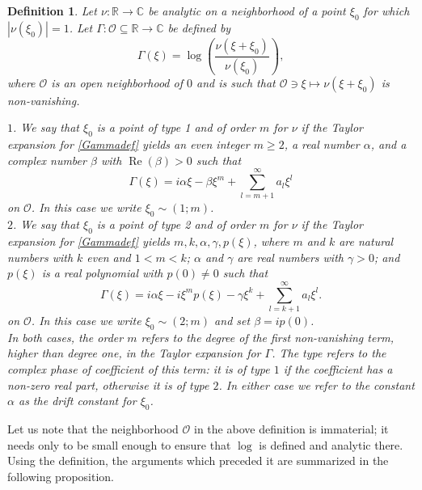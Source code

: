 \documentclass{article}
\theoremstyle{theorem}
\newtheorem{definition}[theorem]{Definition}
\theoremstyle{remark}
\renewcommand\Re{\operatorname{Re}}%
\begin{document}
\begin{definition}\label{types}
Let  $\nu:\mathbb{R}\rightarrow\mathbb{C}$ be analytic on a neighborhood of a point $\xi_0$ for which $|\nu(\xi_0)|=1$. Let $\Gamma:\mathcal{O}\subseteq\mathbb{R}\rightarrow \mathbb{C}$ be defined by
\begin{equation}\label{Gammadef}
\Gamma(\xi)=\log\left(\frac{\nu(\xi+\xi_0)}{\nu(\xi_0)}\right),
\end{equation}
where $\mathcal{O}$ is an open neighborhood of $0$ and is such that $\mathcal{O}\ni\xi\mapsto\nu(\xi+\xi_0)$ is non-vanishing.

\noindent $1$. We say that $\xi_0$ is a point of type 1 and of order $m$ for
$\nu$ if the Taylor expansion for \eqref{Gammadef} yields an even integer $m\geq 2$, a real number $\alpha$, and a
complex number $\beta$ with $\Re(\beta)>0$ such that 
\begin{equation}\label{type1}
\Gamma(\xi)=i\alpha \xi -\beta \xi^m+\sum_{l=m+1}^{\infty}a_l\xi^l
\end{equation}
on $\mathcal{O}$. In this case we write $\xi_0\sim(1;m)$.\\

\noindent $2$. We say that $\xi_0$ is a point of type 2 and of order $m$ for
$\nu$ if the Taylor expansion for \eqref{Gammadef} yields $m,k, \alpha, \gamma, p(\xi)$, where $m$ and $k$ are
natural numbers with $k$ even and $1<m<k$; $\alpha$ and $\gamma$ are real
numbers with $\gamma>0$; and $p(\xi)$ is a real polynomial with $p(0)\neq 0$
such that 
\begin{equation}\label{type2}
\Gamma(\xi)=i\alpha \xi -i\xi^m p(\xi)-\gamma \xi^k+\sum_{l=k+1}^{\infty}a_l\xi^l.
\end{equation}
on $\mathcal{O}$. In this case we write $\xi_0\sim(2;m)$ and set $\beta=ip(0)$.\\

\noindent In both cases, the order $m$ refers to the degree of the first non-vanishing term, higher than degree one, in the Taylor expansion for $\Gamma$. The type refers to the complex phase of coefficient of this term: it is of type $1$ if the coefficient has a non-zero real part, otherwise it is of type $2$.   In either case we refer to the constant $\alpha$ as the drift
constant for $\xi_0$.
\end{definition}

\noindent Let us note that the neighborhood $\mathcal{O}$ in the above definition is immaterial; it needs only to be small enough to ensure that $\log$ is defined and analytic there. Using the definition, the arguments which preceded it are summarized in the following proposition.
\end{document}
